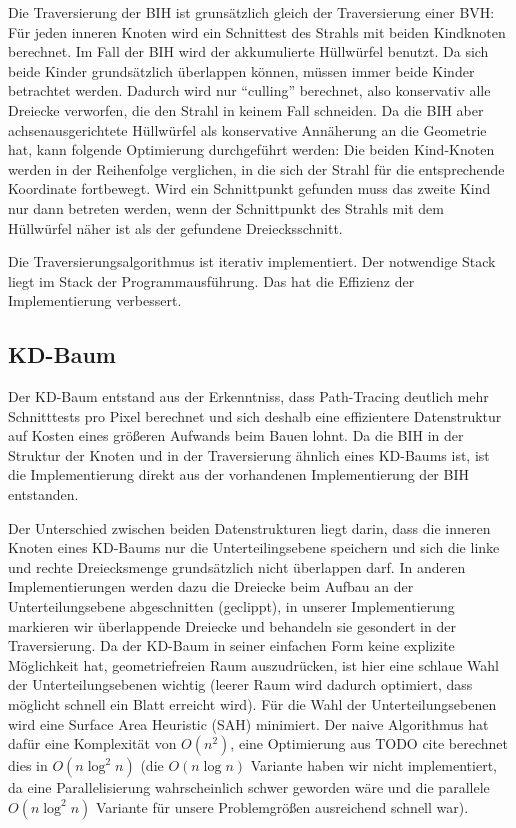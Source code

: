 Die Traversierung der BIH ist grunsätzlich gleich der Traversierung einer BVH: Für jeden inneren Knoten wird ein Schnittest des Strahls mit beiden Kindknoten berechnet. Im Fall der BIH wird der akkumulierte Hüllwürfel benutzt. Da sich beide Kinder grundsätzlich überlappen können, müssen immer beide Kinder betrachtet werden. Dadurch wird nur "`culling"' berechnet, also konservativ alle Dreiecke verworfen, die den Strahl in keinem Fall schneiden. Da die BIH aber achsenausgerichtete Hüllwürfel als konservative Annäherung an die Geometrie hat, kann folgende Optimierung durchgeführt werden: Die beiden Kind-Knoten werden in der Reihenfolge verglichen, in die sich der Strahl für die entsprechende Koordinate fortbewegt. Wird ein Schnittpunkt gefunden muss das zweite Kind nur dann betreten werden, wenn der Schnittpunkt des Strahls mit dem Hüllwürfel näher ist als der gefundene Dreiecksschnitt.

Die Traversierungsalgorithmus ist iterativ implementiert. Der notwendige Stack liegt im Stack der Programmausführung. Das hat die Effizienz der Implementierung verbessert.

\subsection{KD-Baum}
\label{ssec:kdtree}

Der KD-Baum entstand aus der Erkenntniss, dass Path-Tracing deutlich mehr Schnitttests pro Pixel berechnet und sich deshalb eine effizientere Datenstruktur auf Kosten eines größeren Aufwands beim Bauen lohnt. Da die BIH in der Struktur der Knoten und in der Traversierung ähnlich eines KD-Baums ist, ist die Implementierung direkt aus der vorhandenen Implementierung der BIH entstanden.

Der Unterschied zwischen beiden Datenstrukturen liegt darin, dass die inneren Knoten eines KD-Baums nur die Unterteilingsebene speichern und sich die linke und rechte Dreiecksmenge grundsätzlich nicht überlappen darf. In anderen Implementierungen werden dazu die Dreiecke beim Aufbau an der Unterteilungsebene abgeschnitten (geclippt), in unserer Implementierung markieren wir überlappende Dreiecke und behandeln sie gesondert in der Traversierung. Da der KD-Baum in seiner einfachen Form keine explizite Möglichkeit hat, geometriefreien Raum auszudrücken, ist hier eine schlaue Wahl der Unterteilungsebenen wichtig (leerer Raum wird dadurch optimiert, dass möglicht schnell ein Blatt erreicht wird). Für die Wahl der Unterteilungsebenen wird eine Surface Area Heuristic (SAH) minimiert. Der naive Algorithmus hat dafür eine Komplexität von $O(n^2)$, eine Optimierung aus TODO cite berechnet dies in $O(n \log^2 n)$ (die $O(n \log n)$ Variante haben wir nicht implementiert, da eine Parallelisierung wahrscheinlich schwer geworden wäre und die parallele $O(n \log^2 n)$ Variante für unsere Problemgrößen ausreichend schnell war).

